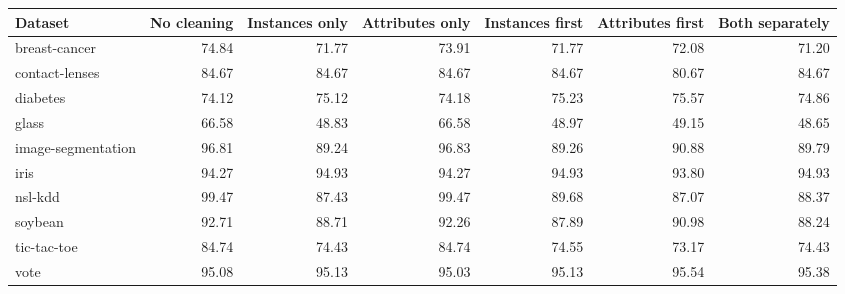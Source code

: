 \begin{tabular}{lrrrrrr}
\toprule
Dataset & No cleaning & Instances only & Attributes only & Instances first & Attributes first & Both separately \\
\midrule
breast-cancer & 74.84 & 71.77 & 73.91 & 71.77 & 72.08 & 71.20 \\
contact-lenses & 84.67 & 84.67 & 84.67 & 84.67 & 80.67 & 84.67 \\
diabetes & 74.12 & 75.12 & 74.18 & 75.23 & 75.57 & 74.86 \\
glass & 66.58 & 48.83 & 66.58 & 48.97 & 49.15 & 48.65 \\
image-segmentation & 96.81 & 89.24 & 96.83 & 89.26 & 90.88 & 89.79 \\
iris & 94.27 & 94.93 & 94.27 & 94.93 & 93.80 & 94.93 \\
nsl-kdd & 99.47 & 87.43 & 99.47 & 89.68 & 87.07 & 88.37 \\
soybean & 92.71 & 88.71 & 92.26 & 87.89 & 90.98 & 88.24 \\
tic-tac-toe & 84.74 & 74.43 & 84.74 & 74.55 & 73.17 & 74.43 \\
vote & 95.08 & 95.13 & 95.03 & 95.13 & 95.54 & 95.38 \\
\bottomrule
\end{tabular}
